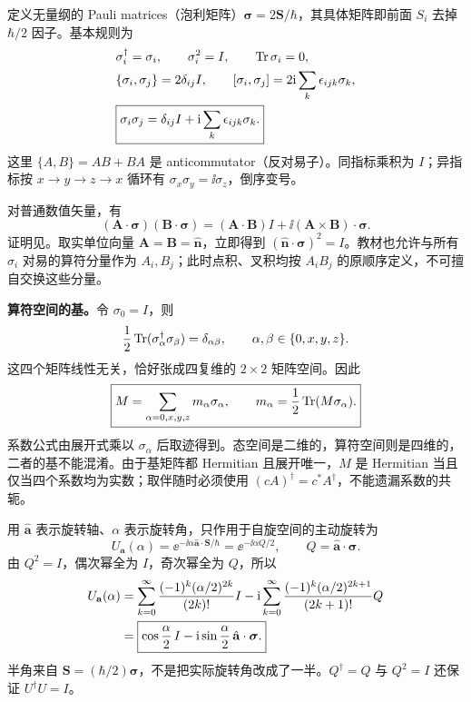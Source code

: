 定义无量纲的 Pauli matrices（泡利矩阵）$\boldsymbol\sigma=2\mathbf S/\hbar$，其具体矩阵即前面 $S_i$ 去掉 $\hbar/2$ 因子。基本规则为
\begin{align}
  &\sigma_i^\dagger=\sigma_i,\qquad \sigma_i^2=I,\qquad \operatorname{Tr}\sigma_i=0,\\
  &\{\sigma_i,\sigma_j\}=2\delta_{ij}I,\qquad
    [\sigma_i,\sigma_j]=2\mathrm{i}\sum_k\epsilon_{ijk}\sigma_k,\\
  &\boxed{\sigma_i\sigma_j=\delta_{ij}I+\mathrm{i}\sum_k\epsilon_{ijk}\sigma_k.}
\end{align}
这里 $\{A,B\}=AB+BA$ 是 anticommutator（反对易子）。同指标乘积为 $I$；异指标按 $x\to y\to z\to x$ 循环有 $\sigma_x\sigma_y=\ii\sigma_z$，倒序变号。

对普通数值矢量，有
\begin{equation}
  \boxed{(\mathbf A\cdot\boldsymbol\sigma)(\mathbf B\cdot\boldsymbol\sigma)
    =(\mathbf A\cdot\mathbf B)I
      +\ii(\mathbf A\times\mathbf B)\cdot\boldsymbol\sigma.}
\end{equation}
证明见。取实单位向量 $\mathbf A=\mathbf B=\hat{\mathbf n}$，立即得到 $(\hat{\mathbf n}\cdot\boldsymbol\sigma)^2=I$。教材也允许与所有 $\sigma_i$ 对易的算符分量作为 $A_i,B_j$；此时点积、叉积均按 $A_iB_j$ 的原顺序定义，不可擅自交换这些分量。

\textbf{算符空间的基。}令 $\sigma_0=I$，则
\begin{equation}
  \frac12\operatorname{Tr}(\sigma_\alpha^\dagger\sigma_\beta)
     =\delta_{\alpha\beta},\qquad \alpha,\beta\in\{0,x,y,z\}.
\end{equation}
这四个矩阵线性无关，恰好张成四复维的 $2\times2$ 矩阵空间。因此
\begin{equation}
  \boxed{M=\sum_{\alpha=0,x,y,z}m_\alpha\sigma_\alpha,
    \qquad m_\alpha=\frac12\operatorname{Tr}(M\sigma_\alpha).}
\end{equation}
系数公式由展开式乘以 $\sigma_\alpha$ 后取迹得到。态空间是二维的，算符空间则是四维的，二者的基不能混淆。由于基矩阵都 Hermitian 且展开唯一，$M$ 是 Hermitian 当且仅当四个系数均为实数；取伴随时必须使用 $(cA)^\dagger=c^*A^\dagger$，不能遗漏系数的共轭。

用 $\hat{\mathbf a}$ 表示旋转轴、$\alpha$ 表示旋转角，只作用于自旋空间的主动旋转为
\begin{equation}
  U_{\mathbf a}(\alpha)=\ee^{-\ii\alpha\hat{\mathbf a}\cdot\mathbf S/\hbar}
     =\ee^{-\ii\alpha Q/2},\qquad Q=\hat{\mathbf a}\cdot\boldsymbol\sigma.
\end{equation}
由 $Q^2=I$，偶次幂全为 $I$，奇次幂全为 $Q$，所以
\begin{align}
  U_{\mathbf a}(\alpha)
    &=\sum_{k=0}^\infty\frac{(-1)^k(\alpha/2)^{2k}}{(2k)!}I
       -\mathrm{i}\sum_{k=0}^\infty\frac{(-1)^k(\alpha/2)^{2k+1}}{(2k+1)!}Q\notag\\
    &=\boxed{\cos\frac\alpha2\,I
        -\mathrm{i}\sin\frac\alpha2\,\hat{\mathbf a}\cdot\boldsymbol\sigma.}
\end{align}
半角来自 $\mathbf S=(\hbar/2)\boldsymbol\sigma$，不是把实际旋转角改成了一半。$Q^\dagger=Q$ 与 $Q^2=I$ 还保证 $U^\dagger U=I$。

